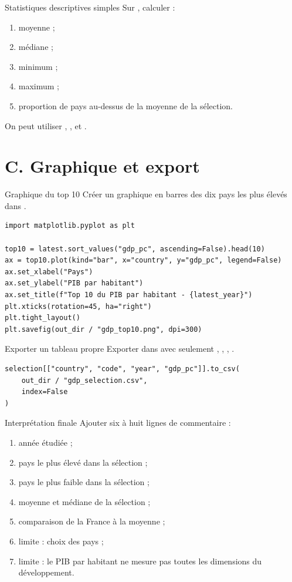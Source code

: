 \documentclass[11pt,a4paper]{article}
\begin{document}
\begin{mandatoryexercise}{Statistiques descriptives simples}
Sur , calculer :
\begin{enumerate}
  \item moyenne ;
  \item médiane ;
  \item minimum ;
  \item maximum ;
  \item proportion de pays au-dessus de la moyenne de la sélection.
\end{enumerate}
On peut utiliser , ,  et .
\end{mandatoryexercise}

\section*{C. Graphique et export}

\begin{mandatoryexercise}{Graphique du top 10}
Créer un graphique en barres des dix pays les plus élevés dans .
\begin{lstlisting}
import matplotlib.pyplot as plt

top10 = latest.sort_values("gdp_pc", ascending=False).head(10)
ax = top10.plot(kind="bar", x="country", y="gdp_pc", legend=False)
ax.set_xlabel("Pays")
ax.set_ylabel("PIB par habitant")
ax.set_title(f"Top 10 du PIB par habitant - {latest_year}")
plt.xticks(rotation=45, ha="right")
plt.tight_layout()
plt.savefig(out_dir / "gdp_top10.png", dpi=300)
\end{lstlisting}
\end{mandatoryexercise}

\begin{mandatoryexercise}{Exporter un tableau propre}
Exporter  dans  avec seulement , , , .
\begin{lstlisting}
selection[["country", "code", "year", "gdp_pc"]].to_csv(
    out_dir / "gdp_selection.csv",
    index=False
)
\end{lstlisting}
\end{mandatoryexercise}

\begin{mandatoryexercise}{Interprétation finale}
Ajouter six à huit lignes de commentaire :
\begin{enumerate}
  \item année étudiée ;
  \item pays le plus élevé dans la sélection ;
  \item pays le plus faible dans la sélection ;
  \item moyenne et médiane de la sélection ;
  \item comparaison de la France à la moyenne ;
  \item limite : choix des pays ;
  \item limite : le PIB par habitant ne mesure pas toutes les dimensions du développement.
\end{enumerate}
\end{mandatoryexercise}
\end{document}

